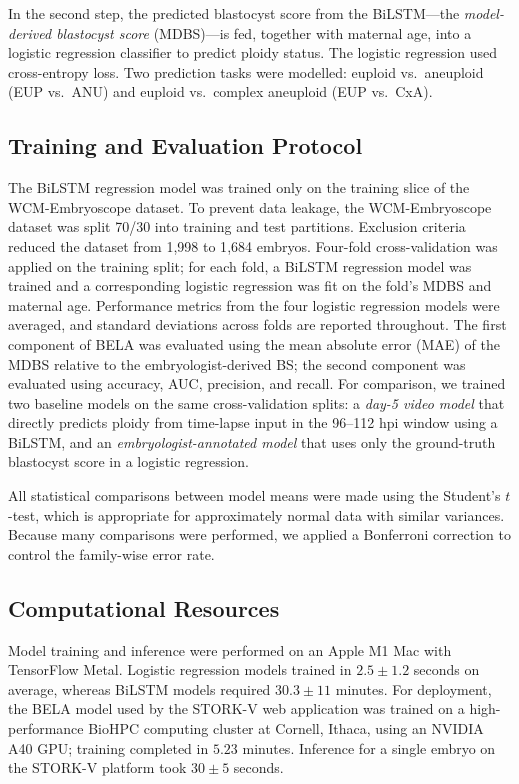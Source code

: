 \documentclass[11pt,a4paper]{article}
\begin{document}
In the second step, the predicted blastocyst score from the BiLSTM---the
\emph{model-derived blastocyst score} (MDBS)---is fed, together with
maternal age, into a logistic regression classifier to predict ploidy
status. The logistic regression used cross-entropy loss. Two prediction
tasks were modelled: euploid vs.\ aneuploid (EUP vs.\ ANU) and euploid vs.\
complex aneuploid (EUP vs.\ CxA).

\subsection{Training and Evaluation Protocol}

The BiLSTM regression model was trained only on the training slice of the
WCM-Embryoscope dataset. To prevent data leakage, the WCM-Embryoscope
dataset was split 70/30 into training and test partitions. Exclusion
criteria reduced the dataset from 1{,}998 to 1{,}684 embryos. Four-fold
cross-validation was applied on the training split; for each fold, a
BiLSTM regression model was trained and a corresponding logistic
regression was fit on the fold's MDBS and maternal age. Performance
metrics from the four logistic regression models were averaged, and
standard deviations across folds are reported throughout. The first
component of BELA was evaluated using the mean absolute error (MAE) of
the MDBS relative to the embryologist-derived BS; the second component
was evaluated using accuracy, AUC, precision, and recall. For comparison,
we trained two baseline models on the same cross-validation splits: a
\emph{day-5 video model} that directly predicts ploidy from time-lapse
input in the 96--112 hpi window using a BiLSTM, and an
\emph{embryologist-annotated model} that uses only the ground-truth
blastocyst score in a logistic regression.

All statistical comparisons between model means were made using the
Student's $t$-test, which is appropriate for approximately normal data
with similar variances. Because many comparisons were performed, we
applied a Bonferroni correction to control the family-wise error rate.

\subsection{Computational Resources}

Model training and inference were performed on an Apple M1 Mac with
TensorFlow Metal. Logistic regression models trained in $2.5 \pm 1.2$
seconds on average, whereas BiLSTM models required $30.3 \pm 11$ minutes.
For deployment, the BELA model used by the STORK-V web application was
trained on a high-performance BioHPC computing cluster at Cornell, Ithaca,
using an NVIDIA A40 GPU; training completed in $5.23$ minutes. Inference
for a single embryo on the STORK-V platform took $30 \pm 5$ seconds.
\end{document}
